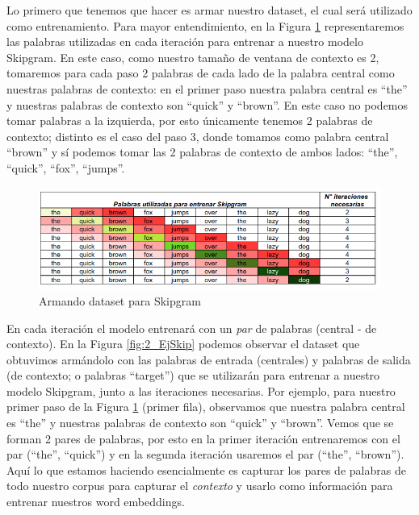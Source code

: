\documentclass[12pt,a4paper]{article}
\begin{document}
\begin{sloppypar}
Lo primero que tenemos que hacer es armar nuestro dataset, el cual será utilizado como entrenamiento. Para mayor entendimiento, en la Figura \ref{fig:1_EjSkip} representaremos las palabras utilizadas en cada iteración para entrenar a nuestro modelo Skipgram. En este caso, como nuestro tamaño de ventana de contexto es 2, tomaremos para cada paso 2 palabras de cada lado de la palabra central como nuestras palabras de contexto: en el primer paso nuestra palabra central es “the” y nuestras palabras de contexto son “quick” y “brown”. En este caso no podemos tomar palabras a la izquierda, por esto únicamente tenemos 2 palabras de contexto; distinto es el caso del paso 3, donde tomamos como palabra central “brown” y sí podemos tomar las 2 palabras de contexto de ambos lados: “the”, “quick”, “fox”, “jumps”. 

\begin{figure}[H]    %
\centering
\includegraphics[width=1\textwidth]{images/Ejemplo_Skipgram/1_EjSkip.png}
\caption{Armando dataset para Skipgram} 
\label{fig:1_EjSkip}
\end{figure}

En cada iteración el modelo entrenará con un \textit{par} de palabras (central - de contexto). En la Figura \ref{fig:2_EjSkip} podemos observar el dataset que obtuvimos armándolo con las palabras de entrada (centrales) y palabras de salida (de contexto; o palabras “target”) que se utilizarán para entrenar a nuestro modelo Skipgram, junto a las iteraciones necesarias.  Por ejemplo, para nuestro primer paso de la Figura \ref{fig:1_EjSkip} (primer fila), observamos que nuestra palabra central es “the” y nuestras palabras de contexto son “quick” y “brown”. Vemos que se forman 2 pares de palabras, por esto en la primer iteración entrenaremos con el par (“the”, “quick”) y en la segunda iteración usaremos el par (“the”, “brown”). Aquí lo que estamos haciendo esencialmente es capturar los pares de palabras de todo nuestro corpus para capturar el \textit{contexto} y usarlo como información para entrenar nuestros word embeddings. 


\end{sloppypar}
\end{document}
